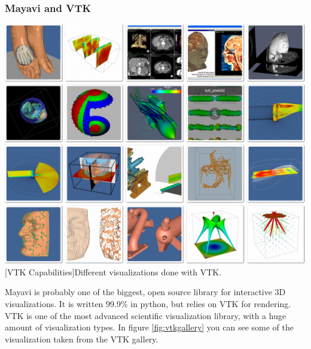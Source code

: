 \subsubsection{Mayavi and VTK}
\vspace{1em}
\begin{minipage}{\linewidth}
    \centering
    \includegraphics[width=0.9\linewidth]{graphics/vtk.jpg}
    [VTK Capabilities]{Different visualizations done with VTK.}
    \label{fig:vtkgallery}
\end{minipage}
Mayavi is probably one of the biggest, open source library for interactive 3D visualizations.
It is written 99.9\% in python, but relies on \ac{VTK} for rendering.
\ac{VTK} is one of the most advanced scientific visualization library, with a huge amount of visualization types. In figure \ref{fig:vtkgallery} you can see some of the visualization taken from the \ac{VTK} gallery\cite{VTKGallery}.

